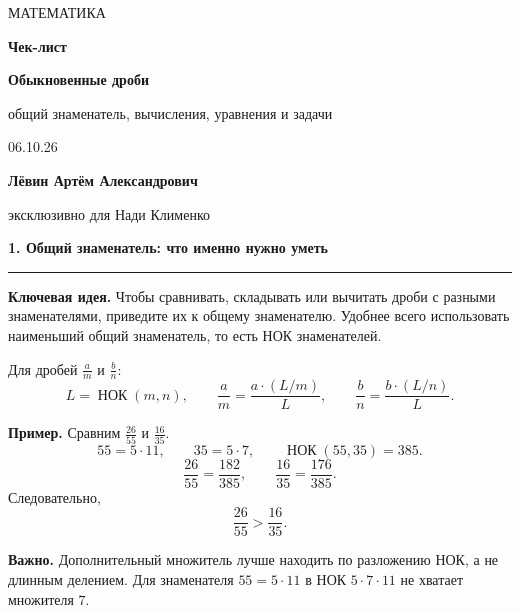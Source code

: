 \documentclass[a4paper,12pt]{article}
\newcommand{\sectiontitle}[1]{%
  \vspace{0.7em}
  {\large\bfseries\color{darkaccent}#1}\par
  \vspace{0.2em}\color{linegray}\hrule\color{textgray}\vspace{0.55em}
}
\newcommand{\keyidea}[1]{\textbf{Ключевая идея.} #1}
\newcommand{\warning}[1]{\textbf{Важно.} #1}
\newcommand{\ex}[1]{\textbf{Пример.} #1}
\begin{document}
\color{textgray}

\begin{titlepage}
\thispagestyle{empty}
\centering
\vspace*{26mm}
{\small\color{softgray} МАТЕМАТИКА}\par
\vspace{8mm}
{\Huge\bfseries\color{darkaccent} Чек-лист}\par
\vspace{5mm}
{\LARGE\bfseries Обыкновенные дроби}\par
\vspace{2mm}
{\large общий знаменатель, вычисления, уравнения и задачи}\par
\vspace{15mm}
{\large 06.10.26}\par
\vfill
{\large\bfseries Лёвин Артём Александрович}\par
\vspace{2mm}
{\normalsize эксклюзивно для Нади Клименко}\par
\vspace{17mm}
\end{titlepage}

\sectiontitle{1. Общий знаменатель: что именно нужно уметь}

\keyidea{Чтобы сравнивать, складывать или вычитать дроби с разными знаменателями, приведите их к общему знаменателю. Удобнее всего использовать наименьший общий знаменатель, то есть НОК знаменателей.}

Для дробей \(\frac{a}{m}\) и \(\frac{b}{n}\):
\[
L=\mathop{\text{НОК}}(m,n),\qquad
\frac{a}{m}=\frac{a\cdot(L/m)}{L},\qquad
\frac{b}{n}=\frac{b\cdot(L/n)}{L}.
\]

\ex{Сравним \(\frac{26}{55}\) и \(\frac{16}{35}\).}
\[
55=5\cdot 11,\qquad 35=5\cdot 7,\qquad \mathop{\text{НОК}}(55,35)=385.
\]
\[
\frac{26}{55}=\frac{182}{385},\qquad
\frac{16}{35}=\frac{176}{385}.
\]
Следовательно,
\[
\boxed{\frac{26}{55}>\frac{16}{35}}.
\]

\warning{Дополнительный множитель лучше находить по разложению НОК, а не длинным делением. Для знаменателя \(55=5\cdot11\) в НОК \(5\cdot7\cdot11\) не хватает множителя \(7\).}
\end{document}
